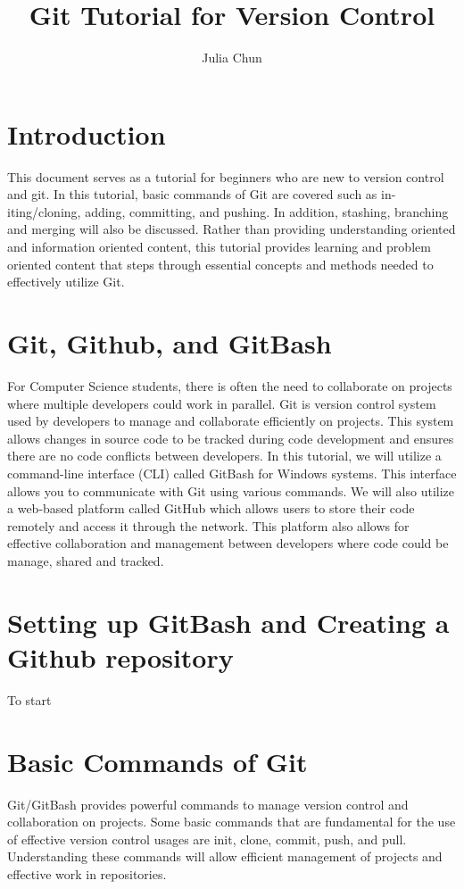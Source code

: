 \documentclass[10pt,twocolumn]{article}
\title{Git Tutorial for Version Control}
\author{Julia Chun}
\affiliation{Occidental College}
\begin{document}
\maketitle

\section{Introduction}

This document serves as a tutorial for beginners who are new to version control and git. In this tutorial, basic commands of Git are covered such as in-iting/cloning, adding, committing, and pushing. In addition, stashing, branching and merging will also be discussed. Rather than providing understanding oriented and information oriented content, this tutorial provides learning and problem oriented content that steps through essential concepts and methods needed to effectively utilize Git.  

\section{Git, Github, and GitBash}
For Computer Science students, there is often the need to collaborate on projects where multiple developers could work in parallel. Git is  version control system used by developers to manage and collaborate efficiently on projects. This system allows changes in source code to be tracked during code development and ensures there are no code conflicts between developers. In this tutorial, we will utilize a command-line interface (CLI) called GitBash for Windows systems. This interface allows you to communicate with Git using various commands. We will also utilize a web-based platform called GitHub which allows users to store their code remotely and access it through the network. This platform also allows for effective collaboration and management between developers where code could be manage, shared and tracked. 
\section {Setting up GitBash and Creating a Github repository}
To start 


\section {Basic Commands of Git}
Git/GitBash provides powerful commands to manage version control and collaboration on projects. Some basic commands that are fundamental for the use of effective version control usages are init, clone, commit, push, and pull. Understanding these commands will allow efficient management of projects and effective work in repositories. 
\end{document}
